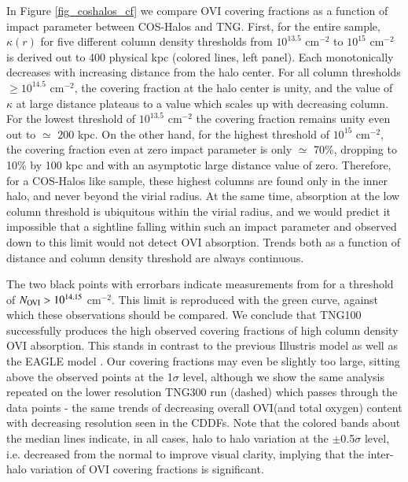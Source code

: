 \documentclass[useAMS,usenatbib]{mnras}
\newcommand{\ovi}{OVI\xspace}
\begin{document}
In Figure \ref{fig_coshalos_cf} we compare \ovi covering fractions as a function of impact parameter between COS-Halos and TNG. First, for the entire sample, $\kappa(r)$ for five different column density thresholds from $10^{13.5}$ cm$^{-2}$ to $10^{15}$ cm$^{-2}$ is derived out to 400 physical kpc (colored lines, left panel). Each monotonically decreases with increasing distance from the halo center. For all column thresholds $\ge 10^{14.5}$ cm$^{-2}$, the covering fraction at the halo center is unity, and the value of $\kappa$ at large distance plateaus to a value which scales up with decreasing column. For the lowest threshold of $10^{13.5}$ cm$^{-2}$ the covering fraction remains unity even out to $\simeq$ 200 kpc. On the other hand, for the highest threshold of $10^{15}$ cm$^{-2}$, the covering fraction even at zero impact parameter is only $\simeq$ 70\%, dropping to 10\% by 100 kpc and with an asymptotic large distance value of zero. Therefore, for a COS-Halos like sample, these highest columns are found only in the inner halo, and never beyond the virial radius. At the same time, absorption at the low column threshold is ubiquitous within the virial radius, and we would predict it impossible that a sightline falling within such an impact parameter and observed down to this limit would not detect \ovi absorption. Trends both as a function of distance and column density threshold are always continuous.

The two black points with errorbars indicate measurements from \cite{werk13} for a threshold of $N_{\rm OVI} > 10^{14.15}$ cm$^{-2}$. This limit is reproduced with the green curve, against which these observations should be compared. We conclude that TNG100 successfully produces the high observed covering fractions of high column density \ovi absorption. This stands in contrast to the previous Illustris model \citep[see][]{suresh17} as well as the EAGLE model \citep[see][]{oppenheimer16}. Our covering fractions may even be slightly too large, sitting above the observed points at the 1$\sigma$ level, although we show the same analysis repeated on the lower resolution TNG300 run (dashed) which passes through the data points - the same trends of decreasing overall \ovi (and total oxygen) content with decreasing resolution seen in the CDDFs. Note that the colored bands about the median lines indicate, in all cases, halo to halo variation at the $\pm$0.5$\sigma$ level, i.e. decreased from the normal to improve visual clarity, implying that the inter-halo variation of \ovi covering fractions is significant.
\end{document}
